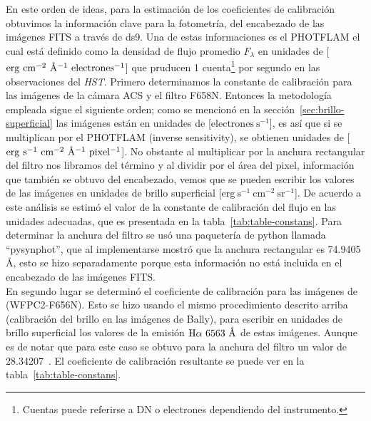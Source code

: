 En este orden de ideas, para la estimación de los coeficientes de calibración obtuvimos la información clave para la fotometría, del encabezado de las imágenes FITS a través de ds9. Una de estas informaciones es el PHOTFLAM el cual está definido como la densidad de flujo promedio \(F_{\lambda}\) en unidades de [\(\mathrm{erg~cm^{-2}~\text{\AA{}}{}^{-1}~electrones^{-1}}\)] que pruducen 1 cuenta\footnote{Cuentas puede referirse a DN o electrones dependiendo del instrumento.} por segundo en las observaciones del \textit{HST}. Primero determinamos la constante de calibración para las imágenes de la cámara ACS y el filtro F658N. Entonces la metodología empleada sigue el siguiente orden; como se mencionó en la sección~\ref{sec:brillo-superficial} las imágenes están en unidades de [\(\mathrm{electrones~s^{-1}}\)], es así que si se multiplican por el PHOTFLAM (inverse sensitivity), se obtienen unidades de [\(\mathrm{erg\ s^{-1}~cm^{-2}~\A{}^{-1}~pixel^{-1}}\)]. No obstante al multiplicar por la anchura rectangular del filtro nos libramos del término \A{} y al dividir por el área del pixel, información que también se obtuvo del encabezado, vemos que se pueden escribir los valores de las imágenes en unidades de brillo superficial [\(\mathrm{erg~s^{-1}~cm^{-2}~sr^{-1}}\)]. De acuerdo a este análisis se estimó el valor de la constante de calibración del flujo en las unidades adecuadas, que es presentada en la tabla~\ref{tab:table-constans}. Para determinar la anchura del filtro se usó una paquetería de python llamada ``pysynphot'', que al implementarse mostró que la anchura rectangular es 74.9405 \(\text{\AA{}}\), esto se hizo separadamente porque esta información no está incluida en el encabezado de las imágenes FITS.\\

En segundo lugar se determinó el coeficiente de calibración  para las imágenes de \citet{Robberto:2013a} (WFPC2-F656N). Esto se hizo usando el mismo procedimiento descrito arriba (calibración del brillo en las imágenes de Bally), para escribir en unidades de brillo superficial los valores de la emisión \(\mathrm{H}\alpha{}~6563~\text{\AA{}}{}\) de estas imágenes. Aunque es de notar que para este caso se obtuvo para la anchura del filtro un valor de 28.34207~\A{}. El coeficiente de calibración resultante se puede ver en la tabla~\ref{tab:table-constans}.\\


